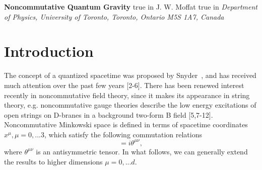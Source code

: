\documentclass[a4paper,10pt]{article}
\begin{document}
\pagestyle{plain}
\setcounter{page}{1}
\begin{center}
{\large\bf Noncommutative Quantum Gravity}
 true in
{\large J. W. Moffat}
 true in
{\it Department of Physics, University of Toronto,
Toronto, Ontario M5S 1A7, Canada}
\end{center}
\begin{abstract}%
The possible role of gravity in a noncommutative geometry is investigated.
Due to the Moyal *-product of fields in noncommutative geometry, it is
necessary to complexify the metric tensor of gravity. We first consider
the possibility of a complex Hermitian, nonsymmetric $g_{\mu\nu}$ and
discuss the problems associated with such a theory. We then introduce a
complex symmetric (non-Hermitian) metric, with the associated
complex connection and curvature, as the basis of a noncommutative
spacetime geometry. The spacetime coordinates are in general complex and
the group of local gauge transformations is associated with the complex
group of Lorentz transformations $CSO(3,1)$. A real action is chosen to
obtain a consistent set of field equations. A Weyl quantization of the
metric associated with the algebra of noncommuting coordinates is employed.
\end{abstract}



\section{Introduction}

The concept of a quantized spacetime was proposed by Snyder~\cite{Snyder}, and has
received much attention over the past few
years [2-6]. There has been renewed interest
recently in noncommutative field theory, since it makes its appearance
in string theory, e.g. noncommutative gauge theories describe the low
energy excitations of open strings on D-branes in a background two-form B
field [5,7-12]. Noncommutative Minkowski space is defined in
terms of spacetime coordinates $x^\mu,\mu=0,...3$, which satisfy
the following commutation relations
\begin{equation}
[x^\mu,x^\nu]=i\theta^{\mu\nu},
\end{equation}
where $\theta^{\mu\nu}$ is an antisymmetric tensor. In what
follows, we can generally extend the results to higher dimensions
$\mu=0,...d.$
\end{document}
